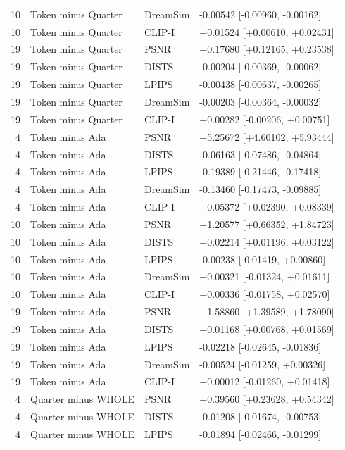 \documentclass[10pt,letterpaper]{article}
\begin{document}
\begin{longtable}{@{}rlll@{}}
10 & Token minus Quarter & DreamSim & -0.00542 [-0.00960, -0.00162]\\
10 & Token minus Quarter & CLIP-I & +0.01524 [+0.00610, +0.02431]\\
19 & Token minus Quarter & PSNR & +0.17680 [+0.12165, +0.23538]\\
19 & Token minus Quarter & DISTS & -0.00204 [-0.00369, -0.00062]\\
19 & Token minus Quarter & LPIPS & -0.00438 [-0.00637, -0.00265]\\
19 & Token minus Quarter & DreamSim & -0.00203 [-0.00364, -0.00032]\\
19 & Token minus Quarter & CLIP-I & +0.00282 [-0.00206, +0.00751]\\
4 & Token minus Ada & PSNR & +5.25672 [+4.60102, +5.93444]\\
4 & Token minus Ada & DISTS & -0.06163 [-0.07486, -0.04864]\\
4 & Token minus Ada & LPIPS & -0.19389 [-0.21446, -0.17418]\\
4 & Token minus Ada & DreamSim & -0.13460 [-0.17473, -0.09885]\\
4 & Token minus Ada & CLIP-I & +0.05372 [+0.02390, +0.08339]\\
10 & Token minus Ada & PSNR & +1.20577 [+0.66352, +1.84723]\\
10 & Token minus Ada & DISTS & +0.02214 [+0.01196, +0.03122]\\
10 & Token minus Ada & LPIPS & -0.00238 [-0.01419, +0.00860]\\
10 & Token minus Ada & DreamSim & +0.00321 [-0.01324, +0.01611]\\
10 & Token minus Ada & CLIP-I & +0.00336 [-0.01758, +0.02570]\\
19 & Token minus Ada & PSNR & +1.58860 [+1.39589, +1.78090]\\
19 & Token minus Ada & DISTS & +0.01168 [+0.00768, +0.01569]\\
19 & Token minus Ada & LPIPS & -0.02218 [-0.02645, -0.01836]\\
19 & Token minus Ada & DreamSim & -0.00524 [-0.01259, +0.00326]\\
19 & Token minus Ada & CLIP-I & +0.00012 [-0.01260, +0.01418]\\
4 & Quarter minus WHOLE & PSNR & +0.39560 [+0.23628, +0.54342]\\
4 & Quarter minus WHOLE & DISTS & -0.01208 [-0.01674, -0.00753]\\
4 & Quarter minus WHOLE & LPIPS & -0.01894 [-0.02466, -0.01299]\\

\end{longtable}
\end{document}
